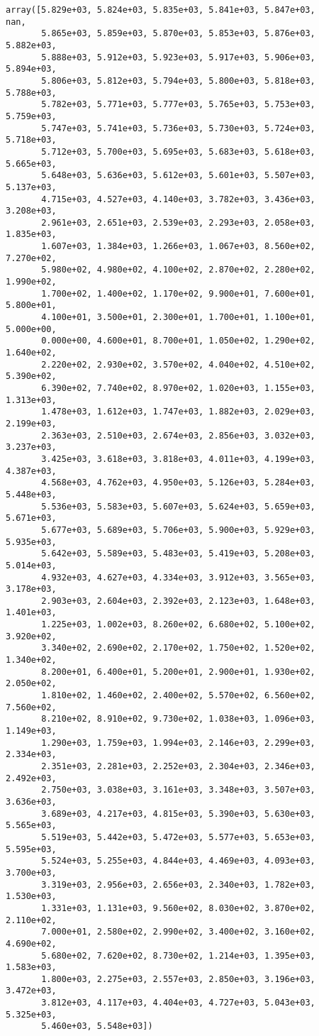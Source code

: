 \documentclass[11pt]{article}
\begin{document}
    \begin{verbatim}
array([5.829e+03, 5.824e+03, 5.835e+03, 5.841e+03, 5.847e+03,       nan,
       5.865e+03, 5.859e+03, 5.870e+03, 5.853e+03, 5.876e+03, 5.882e+03,
       5.888e+03, 5.912e+03, 5.923e+03, 5.917e+03, 5.906e+03, 5.894e+03,
       5.806e+03, 5.812e+03, 5.794e+03, 5.800e+03, 5.818e+03, 5.788e+03,
       5.782e+03, 5.771e+03, 5.777e+03, 5.765e+03, 5.753e+03, 5.759e+03,
       5.747e+03, 5.741e+03, 5.736e+03, 5.730e+03, 5.724e+03, 5.718e+03,
       5.712e+03, 5.700e+03, 5.695e+03, 5.683e+03, 5.618e+03, 5.665e+03,
       5.648e+03, 5.636e+03, 5.612e+03, 5.601e+03, 5.507e+03, 5.137e+03,
       4.715e+03, 4.527e+03, 4.140e+03, 3.782e+03, 3.436e+03, 3.208e+03,
       2.961e+03, 2.651e+03, 2.539e+03, 2.293e+03, 2.058e+03, 1.835e+03,
       1.607e+03, 1.384e+03, 1.266e+03, 1.067e+03, 8.560e+02, 7.270e+02,
       5.980e+02, 4.980e+02, 4.100e+02, 2.870e+02, 2.280e+02, 1.990e+02,
       1.700e+02, 1.400e+02, 1.170e+02, 9.900e+01, 7.600e+01, 5.800e+01,
       4.100e+01, 3.500e+01, 2.300e+01, 1.700e+01, 1.100e+01, 5.000e+00,
       0.000e+00, 4.600e+01, 8.700e+01, 1.050e+02, 1.290e+02, 1.640e+02,
       2.220e+02, 2.930e+02, 3.570e+02, 4.040e+02, 4.510e+02, 5.390e+02,
       6.390e+02, 7.740e+02, 8.970e+02, 1.020e+03, 1.155e+03, 1.313e+03,
       1.478e+03, 1.612e+03, 1.747e+03, 1.882e+03, 2.029e+03, 2.199e+03,
       2.363e+03, 2.510e+03, 2.674e+03, 2.856e+03, 3.032e+03, 3.237e+03,
       3.425e+03, 3.618e+03, 3.818e+03, 4.011e+03, 4.199e+03, 4.387e+03,
       4.568e+03, 4.762e+03, 4.950e+03, 5.126e+03, 5.284e+03, 5.448e+03,
       5.536e+03, 5.583e+03, 5.607e+03, 5.624e+03, 5.659e+03, 5.671e+03,
       5.677e+03, 5.689e+03, 5.706e+03, 5.900e+03, 5.929e+03, 5.935e+03,
       5.642e+03, 5.589e+03, 5.483e+03, 5.419e+03, 5.208e+03, 5.014e+03,
       4.932e+03, 4.627e+03, 4.334e+03, 3.912e+03, 3.565e+03, 3.178e+03,
       2.903e+03, 2.604e+03, 2.392e+03, 2.123e+03, 1.648e+03, 1.401e+03,
       1.225e+03, 1.002e+03, 8.260e+02, 6.680e+02, 5.100e+02, 3.920e+02,
       3.340e+02, 2.690e+02, 2.170e+02, 1.750e+02, 1.520e+02, 1.340e+02,
       8.200e+01, 6.400e+01, 5.200e+01, 2.900e+01, 1.930e+02, 2.050e+02,
       1.810e+02, 1.460e+02, 2.400e+02, 5.570e+02, 6.560e+02, 7.560e+02,
       8.210e+02, 8.910e+02, 9.730e+02, 1.038e+03, 1.096e+03, 1.149e+03,
       1.290e+03, 1.759e+03, 1.994e+03, 2.146e+03, 2.299e+03, 2.334e+03,
       2.351e+03, 2.281e+03, 2.252e+03, 2.304e+03, 2.346e+03, 2.492e+03,
       2.750e+03, 3.038e+03, 3.161e+03, 3.348e+03, 3.507e+03, 3.636e+03,
       3.689e+03, 4.217e+03, 4.815e+03, 5.390e+03, 5.630e+03, 5.565e+03,
       5.519e+03, 5.442e+03, 5.472e+03, 5.577e+03, 5.653e+03, 5.595e+03,
       5.524e+03, 5.255e+03, 4.844e+03, 4.469e+03, 4.093e+03, 3.700e+03,
       3.319e+03, 2.956e+03, 2.656e+03, 2.340e+03, 1.782e+03, 1.530e+03,
       1.331e+03, 1.131e+03, 9.560e+02, 8.030e+02, 3.870e+02, 2.110e+02,
       7.000e+01, 2.580e+02, 2.990e+02, 3.400e+02, 3.160e+02, 4.690e+02,
       5.680e+02, 7.620e+02, 8.730e+02, 1.214e+03, 1.395e+03, 1.583e+03,
       1.800e+03, 2.275e+03, 2.557e+03, 2.850e+03, 3.196e+03, 3.472e+03,
       3.812e+03, 4.117e+03, 4.404e+03, 4.727e+03, 5.043e+03, 5.325e+03,
       5.460e+03, 5.548e+03])
    \end{verbatim}
\end{document}

